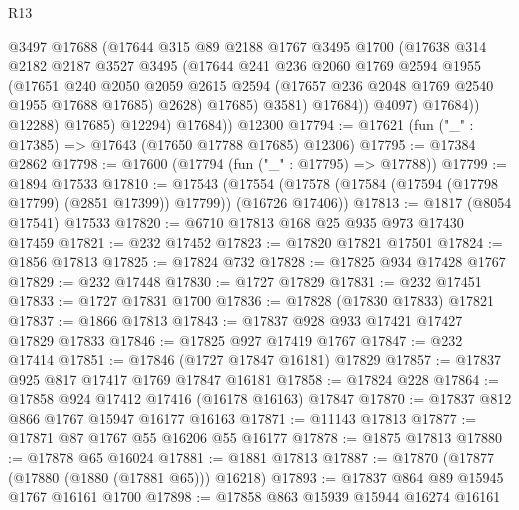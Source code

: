 \begin{lexlean}{R13}
\begin{coremodule}
                      @3497
                      @17688
                      (@17644
                        @315
                        @89
                        @2188
                        @1767
                        @3495
                        @1700
                        (@17638
                          @314
                          @2182
                          @2187
                          @3527
                          @3495
                          (@17644
                            @241
                            @236
                            @2060
                            @1769
                            @2594
                            @1955
                            (@17651
                              @240
                              @2050
                              @2059
                              @2615
                              @2594
                              (@17657 @236 @2048 @1769 @2540 @1955 @17688 @17685)
                              @2628)
                            @17685)
                          @3581)
                        @17684))
                    @4097)
                  @17684))
              @12288)
            @17685)
          @12294)
        @17684))
    @12300
@17794 := @17621 (fun ("_" : @17385) => @17643 (@17650 @17788 @17685) @12306)
@17795 := @17384 @2862
@17798 := @17600 (@17794 (fun ("_" : @17795) => @17788))
@17799 := @1894 @17533
@17810 := @17543
    (@17554 (@17578 (@17584 (@17594 (@17798 @17799) (@2851 @17399)) @17799)) (@16726 @17406))
@17813 := @1817 (@8054 @17541) @17533
@17820 := @6710 @17813 @168 @25 @935 @973 @17430 @17459
@17821 := @232 @17452
@17823 := @17820 @17821 @17501
@17824 := @1856 @17813
@17825 := @17824 @732
@17828 := @17825 @934 @17428 @1767
@17829 := @232 @17448
@17830 := @1727 @17829
@17831 := @232 @17451
@17833 := @1727 @17831 @1700
@17836 := @17828 (@17830 @17833) @17821
@17837 := @1866 @17813
@17843 := @17837 @928 @933 @17421 @17427 @17829 @17833
@17846 := @17825 @927 @17419 @1767
@17847 := @232 @17414
@17851 := @17846 (@1727 @17847 @16181) @17829
@17857 := @17837 @925 @817 @17417 @1769 @17847 @16181
@17858 := @17824 @228
@17864 := @17858 @924 @17412 @17416 (@16178 @16163) @17847
@17870 := @17837 @812 @866 @1767 @15947 @16177 @16163
@17871 := @11143 @17813
@17877 := @17871 @87 @1767 @55 @16206 @55 @16177
@17878 := @1875 @17813
@17880 := @17878 @65 @16024
@17881 := @1881 @17813
@17887 := @17870 (@17877 (@17880 (@1880 (@17881 @65))) @16218)
@17893 := @17837 @864 @89 @15945 @1767 @16161 @1700
@17898 := @17858 @863 @15939 @15944 @16274 @16161

\end{coremodule}
\end{lexlean}

